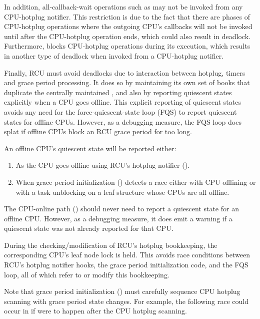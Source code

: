 In addition, all-callback-wait operations such as  may
not be invoked from any CPU-hotplug notifier.
This restriction is due
to the fact that there are phases of CPU-hotplug operations where the
outgoing CPU's callbacks will not be invoked until after the CPU-hotplug
operation ends, which could also result in deadlock.
Furthermore,
 blocks CPU-hotplug operations during its execution,
which results in another type of deadlock when invoked from a CPU-hotplug
notifier.

Finally, RCU must avoid deadlocks due to interaction between hotplug,
timers and grace period processing.
It does so by maintaining its own set
of books that duplicate the centrally maintained ,
and also by reporting quiescent states explicitly when a CPU goes
offline.
This explicit reporting of quiescent states avoids any need
for the force-quiescent-state loop (FQS) to report quiescent states for
offline CPUs.
However, as a debugging measure, the FQS loop does splat
if offline CPUs block an RCU grace period for too long.

An offline CPU's quiescent state will be reported either:

\begin{enumerate}
\item  As the CPU goes offline using RCU's hotplug notifier ().
\item  When grace period initialization () detects a
    race either with CPU offlining or with a task unblocking on a leaf
     structure whose CPUs are all offline.
\end{enumerate}

The CPU-online path () should never need to report
a quiescent state for an offline CPU\@.
However, as a debugging measure,
it does emit a warning if a quiescent state was not already reported
for that CPU\@.

During the checking/modification of RCU's hotplug bookkeeping, the
corresponding CPU's leaf node lock is held.
This avoids race conditions
between RCU's hotplug notifier hooks, the grace period initialization
code, and the FQS loop, all of which refer to or modify this bookkeeping.

Note that grace period initialization () must
carefully sequence CPU hotplug scanning with grace period state changes.
For example, the following race could occur in 
if  were to happen after the CPU hotplug scanning.

